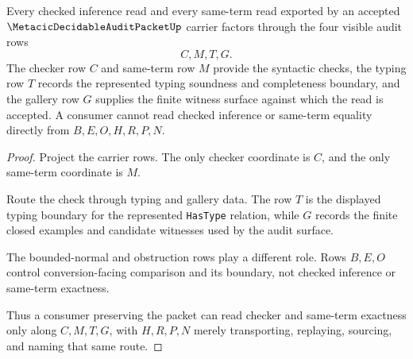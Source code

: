 \begin{theorem}
\label{thm:metacic-decidable-audit-packet-checker-exactness-route}
Every checked inference read and every same-term read exported by an accepted $\MetacicDecidableAuditPacketUp$ carrier factors through the four visible audit rows
$$
C,M,T,G.
$$
The checker row $C$ and same-term row $M$ provide the syntactic checks, the typing row $T$ records the represented typing soundness and completeness boundary, and the gallery row $G$ supplies the finite witness surface against which the read is accepted. A consumer cannot read checked inference or same-term equality directly from $B,E,O,H,R,P,N$.
\end{theorem}
\begin{proof}
Project the carrier rows. The only checker coordinate is $C$, and the only same-term coordinate is $M$.

Route the check through typing and gallery data. The row $T$ is the displayed typing boundary for the represented \texttt{HasType} relation, while $G$ records the finite closed examples and candidate witnesses used by the audit surface.

The bounded-normal and obstruction rows play a different role. Rows $B,E,O$ control conversion-facing comparison and its boundary, not checked inference or same-term exactness.

Thus a consumer preserving the packet can read checker and same-term exactness only along $C,M,T,G$, with $H,R,P,N$ merely transporting, replaying, sourcing, and naming that same route.
\end{proof}

